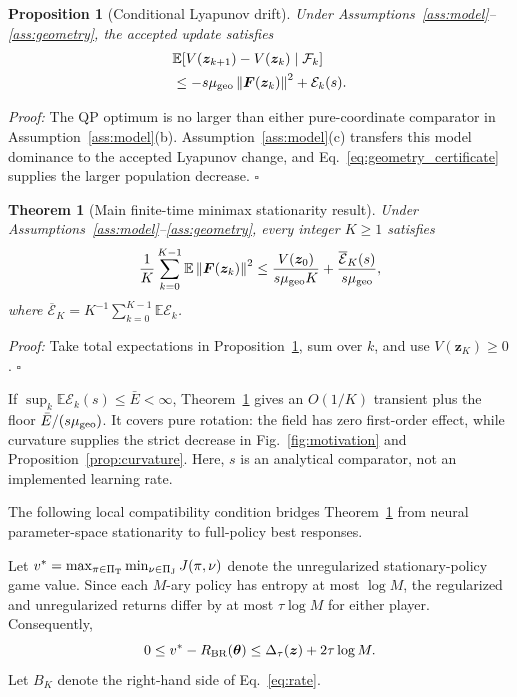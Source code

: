 \documentclass[conference]{IEEEtran}
\newcommand{\bF}{\bm{F}}
\newcommand{\bz}{\bm{z}}
\newcommand{\btheta}{\bm{\theta}}
\newcommand{\E}{\mathbb{E}}
\newcommand{\norm}[1]{\left\lVert #1\right\rVert}
\newtheorem{proposition}{Proposition}
\newtheorem{theorem}{Theorem}
\begin{document}
\begin{proposition}[Conditional Lyapunov drift]
\label{prop:drift}
Under Assumptions~\ref{ass:model}--\ref{ass:geometry}, the accepted update satisfies
\[
\begin{aligned}
&\E[V(\bz_{k+1})-V(\bz_k)\mid\mathcal F_k]\\
&\leq-s\mu_{\rm geo}\norm{\bF(\bz_k)}^2
+\mathcal E_k(s).
\end{aligned}
\]
\end{proposition}

\emph{Proof:}
The QP optimum is no larger than either pure-coordinate comparator in Assumption~\ref{ass:model}(b).
Assumption~\ref{ass:model}(c) transfers this model dominance to the accepted Lyapunov change, and Eq.~\eqref{eq:geometry_certificate} supplies the larger population decrease.
\hfill$\square$

\begin{theorem}[Main finite-time minimax stationarity result]
\label{thm:stationarity}
Under Assumptions~\ref{ass:model}--\ref{ass:geometry}, every integer $K\geq1$ satisfies
\begin{equation}
\frac1K\sum_{k=0}^{K-1}\E\norm{\bF(\bz_k)}^2
\leq
\frac{V(\bz_0)}{s\mu_{\rm geo}K}
+\frac{\overline{\mathcal E}_K(s)}{s\mu_{\rm geo}},
\label{eq:rate}
\end{equation}
where $\overline{\mathcal E}_K=K^{-1}\sum_{k=0}^{K-1}\E\mathcal E_k$.
\end{theorem}

\emph{Proof:}
Take total expectations in Proposition~\ref{prop:drift}, sum over $k$, and use $V(\bz_K)\geq0$.
\hfill$\square$

If $\sup_k\E\mathcal E_k(s)\leq\bar E<\infty$, Theorem~\ref{thm:stationarity} gives an $O(1/K)$ transient plus the floor $\bar E/(s\mu_{\rm geo})$.
It covers pure rotation: the field has zero first-order effect, while curvature supplies the strict decrease in Fig.~\ref{fig:motivation} and Proposition~\ref{prop:curvature}.
Here, $s$ is an analytical comparator, not an implemented learning rate.

The following local compatibility condition bridges Theorem~\ref{thm:stationarity} from neural parameter-space stationarity to full-policy best responses.

Let $v^*=\max_{\pi\in\Pi_{\rm T}}\min_{\nu\in\Pi_{\rm J}}J(\pi,\nu)$ denote the unregularized stationary-policy game value.
Since each $M$-ary policy has entropy at most $\log M$, the regularized and unregularized returns differ by at most $\tau\log M$ for either player.
Consequently,
\begin{equation}
0\leq v^*-R_{\rm BR}(\btheta)\leq\Delta_\tau(\bz)+2\tau\log M.
\label{eq:performance_bridge}
\end{equation}
Let $B_K$ denote the right-hand side of Eq.~\eqref{eq:rate}.
\end{document}
